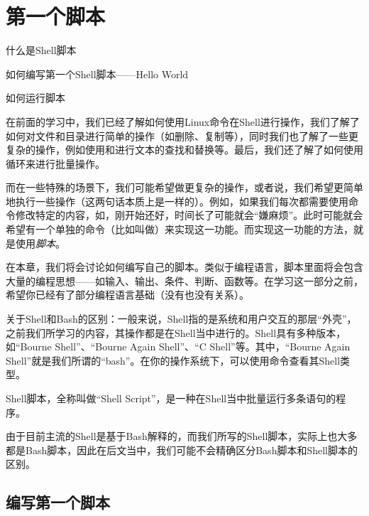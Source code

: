 \section{第一个脚本}\label{sec:第一个脚本}

\begin{Abstract}
    \item 什么是Shell脚本
    \item 如何编写第一个Shell脚本——Hello World
    \item 如何运行脚本
\end{Abstract}

在前面的学习中，我们已经了解如何使用Linux命令在Shell进行操作，我们了解了如何对文件和目录进行简单的操作（如删除、复制等），同时我们也了解了一些更复杂的操作，例如使用和进行文本的查找和替换等。最后，我们还了解了如何使用循环来进行批量操作。

而在一些特殊的场景下，我们可能希望做更复杂的操作，或者说，我们希望更简单地执行一些操作（这两句话本质上是一样的）。例如，如果我们每次都需要使用命令修改特定的内容，如，刚开始还好，时间长了可能就会“嫌麻烦”。此时可能就会希望有一个单独的命令（比如叫做）来实现这一功能。而实现这一功能的方法，就是使用\emph{脚本}。

在本章，我们将会讨论如何编写自己的脚本。类似于编程语言，脚本里面将会包含大量的编程思想——如输入、输出、条件、判断、函数等。在学习这一部分之前，希望你已经有了部分编程语言基础（没有也没有关系）。

\begin{extend}
    关于Shell和Bash的区别：一般来说，Shell指的是系统和用户交互的那层“外壳”，之前我们所学习的内容，其操作都是在Shell当中进行的。Shell具有多种版本，如“Bourne Shell”、“Bourne Again Shell”、“C Shell”等。其中，“Bourne Again Shell”就是我们所谓的“bash”。在你的操作系统下，可以使用命令查看其Shell类型。
    
    Shell脚本，全称叫做“Shell Script”，是一种在Shell当中批量运行多条语句的程序。
    
    由于目前主流的Shell是基于Bash解释的，而我们所写的Shell脚本，实际上也大多都是Bash脚本，因此在后文当中，我们可能不会精确区分Bash脚本和Shell脚本的区别。
\end{extend}

\subsection{编写第一个脚本}\label{subsec:第一个脚本-编写第一个脚本}

